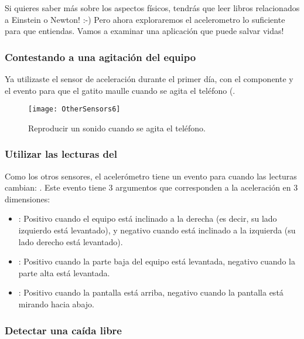 Si quieres saber más sobre los aspectos físicos, tendrás que leer
libros relacionados a Einstein o Newton! :-) Pero ahora exploraremos
el acelerometro lo suficiente para que entiendas. Vamos a examinar una
aplicación que puede salvar vidas!

\subsubsection*{Contestando a una agitación del equipo}

Ya utilizaste el sensor de aceleración durante el primer día, con el
componente  y el evento
 para que el gatito maulle cuando se agita
el teléfono (.

\begin{figure}[H]
\centering
\texttt{[image: OtherSensors6]}
\caption{Reproducir un sonido cuando se agita el teléfono.}
\label{fig:OtherSensors6}
\end{figure}

\subsubsection*{Utilizar las lecturas del }

Como los otros sensores, el acelerómetro tiene un evento para cuando
las lecturas cambian: . Este
evento tiene 3 argumentos que corresponden a la aceleración en 3
dimensiones:

\begin{itemize}

\item {}: Positivo cuando el equipo está inclinado a
  la derecha (es decir, su lado izquierdo está levantado), y negativo
  cuando está inclinado a la izquierda (su lado derecho está
  levantado).

\item {}: Positivo cuando la parte baja del equipo está levantada, negativo
cuando la parte alta está levantada.

\item {}: Positivo cuando la pantalla está arriba,
    negativo cuando la pantalla está mirando hacia abajo.

\end{itemize}

\subsubsection*{Detectar una caída libre}

